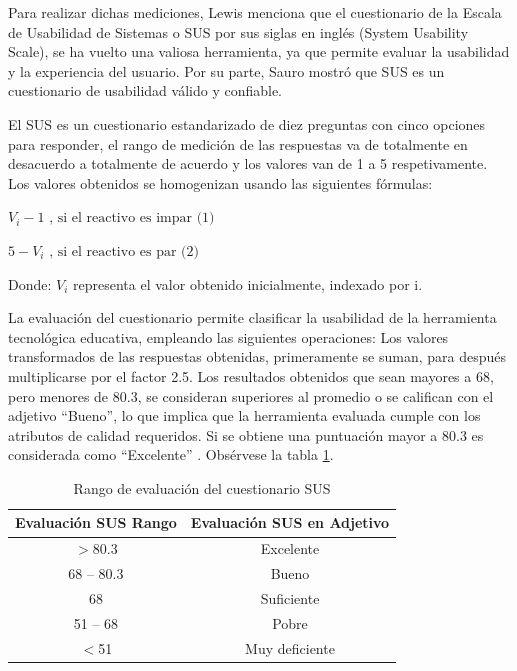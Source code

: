 \documentclass{article}
\begin{document}
Para realizar dichas mediciones, Lewis menciona \cite{lewis2018item} que el 
cuestionario de la Escala de Usabilidad de Sistemas o SUS por sus siglas en 
inglés (System Usability Scale), se ha vuelto una valiosa herramienta, ya que permite 
evaluar la usabilidad y la experiencia del usuario. Por su parte, Sauro 
mostró\cite{ng2011measuring} que SUS es un cuestionario de usabilidad válido y 
confiable. 

El SUS es un cuestionario estandarizado de diez preguntas con cinco opciones 
para responder, el rango de medición de las respuestas va de totalmente en desacuerdo 
a totalmente de acuerdo y los valores van de 1 a 5 respetivamente. Los valores 
obtenidos se homogenizan  usando las siguientes fórmulas: 

\begin{center}
$ V_{i}-1 \textrm{ , si el reactivo es impar (1)} $

$ 5-V_{i} \textrm{ , si el reactivo es par (2)} $
\end{center}

Donde: $V_{i}$ representa el valor obtenido inicialmente, indexado por i.

La evaluación del cuestionario permite clasificar la usabilidad de la herramienta 
tecnológica educativa, empleando las siguientes operaciones: Los valores transformados 
de las respuestas obtenidas, primeramente se suman, para después multiplicarse por 
el factor 2.5. Los resultados obtenidos que sean mayores a 68, pero menores de 80.3, 
se consideran superiores al promedio o se califican con el adjetivo “Bueno”, lo que 
implica que la herramienta evaluada cumple con los atributos de calidad requeridos. 
Si se obtiene una puntuación mayor a 80.3 es considerada como “Excelente” 
\cite{derisma2020usability}. 
Obsérvese la tabla \ref{tab:pruebas01}.

\begin{table}[H]
\centering
\begin{tabular}{|c|c|}
\hline
Evaluación SUS Rango & Evaluación SUS en Adjetivo \\ \hline
$>$80.3 & Excelente \\ \hline
68 – 80.3 & Bueno \\ \hline
68	& Suficiente \\ \hline 
51 – 68 & Pobre \\ \hline 
$<$51 & Muy deficiente \\ \hline
\end{tabular}
\caption{Rango de evaluación del cuestionario SUS}
\label{tab:pruebas01}
\end{table}
\end{document}
